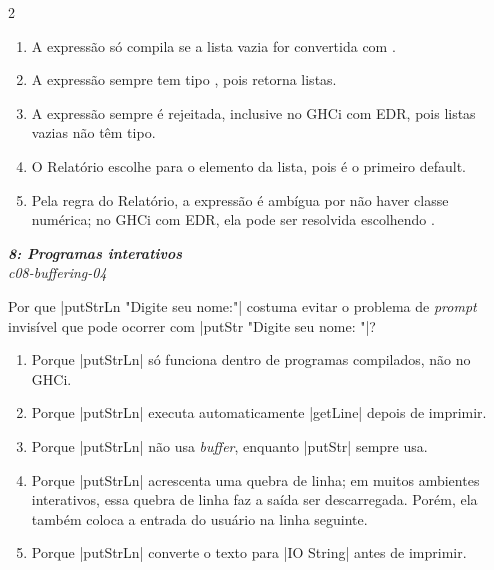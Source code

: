 \documentclass[a4paper,10pt,brazil]{article}
\begin{document}
\begin{multicols}{2}
\begin{enumerate}
  \item A expressão só compila se a lista vazia for convertida com .
  \item A expressão sempre tem tipo \haskellinline{[String]}, pois  retorna listas.
  \item A expressão sempre é rejeitada, inclusive no GHCi com EDR, pois listas vazias não têm tipo.
  \item O Relatório escolhe  para o elemento da lista, pois  é o primeiro default.
  \item Pela regra do Relatório, a expressão é ambígua por não haver classe numérica; no GHCi com EDR, ela pode ser resolvida escolhendo .

\end{enumerate}

\begin{flushright}
  \footnotesize
  \textit{\textbf{8: Programas interativos}}\\
  \textit{c08-buffering-04}\\

\end{flushright}
Por que \haskellinline|putStrLn "Digite seu nome:"| costuma evitar o problema de \emph{prompt} invisível que pode ocorrer com \haskellinline|putStr "Digite seu nome: "|?

\begin{enumerate}
  \item Porque \haskellinline|putStrLn| só funciona dentro de programas compilados, não no GHCi.

  \item Porque \haskellinline|putStrLn| executa automaticamente \haskellinline|getLine| depois de imprimir.

  \item Porque \haskellinline|putStrLn| não usa \emph{buffer}, enquanto \haskellinline|putStr| sempre usa.

  \item Porque \haskellinline|putStrLn| acrescenta uma quebra de linha; em muitos ambientes interativos, essa quebra de linha faz a saída ser descarregada. Porém, ela também coloca a entrada do usuário na linha seguinte.

  \item Porque \haskellinline|putStrLn| converte o texto para \haskellinline|IO String| antes de imprimir.



\end{enumerate}
\end{multicols}
\end{document}
